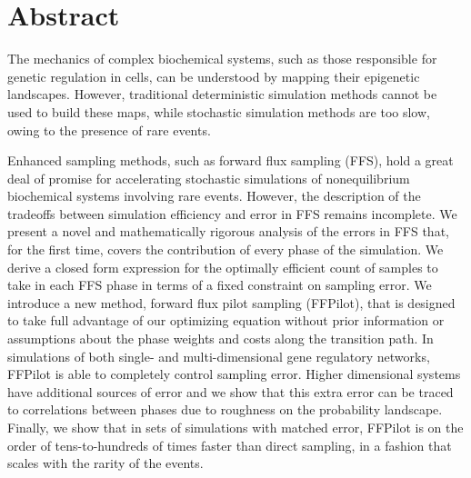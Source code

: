 \chapter*{Abstract}

The mechanics of complex biochemical systems, such as those responsible for genetic regulation in cells, can be understood by mapping their epigenetic landscapes. However, traditional deterministic simulation methods cannot be used to build these maps, while stochastic simulation methods are too slow, owing to the presence of rare events.

Enhanced sampling methods, such as forward flux sampling (FFS), hold a great deal of promise for accelerating stochastic simulations of nonequilibrium biochemical systems involving rare events. However, the description of the tradeoffs between simulation efficiency and error in FFS remains incomplete. We present a novel and mathematically rigorous analysis of the errors in FFS that, for the first time, covers the contribution of every phase of the simulation. We derive a closed form expression for the optimally efficient count of samples to take in each FFS phase in terms of a fixed constraint on sampling error. We introduce a new method, forward flux pilot sampling (FFPilot), that is designed to take full advantage of our optimizing equation without prior information or assumptions about the phase weights and costs along the transition path. In simulations of both single- and multi-dimensional gene regulatory networks, FFPilot is able to completely control sampling error. Higher dimensional systems have additional sources of error and we show that this extra error can be traced to correlations between phases due to roughness on the probability landscape. Finally, we show that in sets of  simulations with matched error, FFPilot is on the order of tens-to-hundreds of times faster than direct sampling, in a fashion that scales with the rarity of the events.